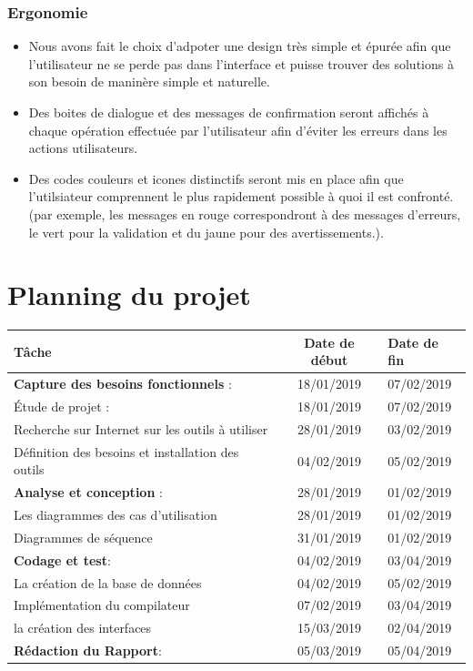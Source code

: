 \documentclass[12pt,a4paper]{article}
\begin{document}
\subsubsection{Ergonomie}
\begin{itemize}
\item Nous avons fait le choix d'adpoter une design très simple et épurée afin que l'utilisateur ne se perde pas dans l'interface et puisse trouver des solutions à son besoin de maninère simple et naturelle.
\item Des boites de dialogue et des messages de confirmation seront affichés à chaque opération effectuée par l'utilisateur afin d'éviter les erreurs dans les actions utilisateurs.
\item Des codes couleurs et icones distinctifs seront mis en place afin que l'utilsiateur comprennent le plus rapidement possible à quoi il est confronté. (par exemple, les messages en rouge correspondront à des messages d'erreurs, le vert pour la validation et du jaune pour des avertissements.).
\end{itemize}

\section{Planning du projet}

\begin{tabularx}{\textwidth}{|l|c|X|}
  \hline
  \textbf{Tâche } & 
  \textbf{Date de début} & 
  \textbf{Date de fin} \\
  \hline
  \textbf{Capture des besoins fonctionnels} :& 18/01/2019 & 07/02/2019
  \\ 
     \hline
 
 Étude de projet : & 18/01/2019 &  07/02/2019
    \\
  \hline
 Recherche sur Internet sur les outils à utiliser  & 28/01/2019 &  03/02/2019
    \\
  \hline
 Définition des besoins et installation des outils  & 04/02/2019 &  05/02/2019
    \\
  \hline
  \textbf{Analyse et conception} :& 28/01/2019 & 01/02/2019
  \\ 
   \hline
  Les diagrammes des cas d'utilisation & 28/01/2019 &  01/02/2019 
    \\
  \hline
  Diagrammes de séquence & 31/01/2019 &  01/02/2019
    \\
    \hline
\textbf{Codage et test}: & 04/02/2019 &  03/04/2019
    \\
      \hline
La création de la base de données & 04/02/2019 &  05/02/2019
    \\
     \hline
Implémentation du compilateur & 07/02/2019 &  03/04/2019
    \\
         \hline
la création des interfaces & 15/03/2019 &  02/04/2019
    \\
       \hline
       

\textbf{Rédaction du Rapport}: & 05/03/2019 &  05/04/2019
  \\
  \hline

\end{tabularx}
\end{document}
